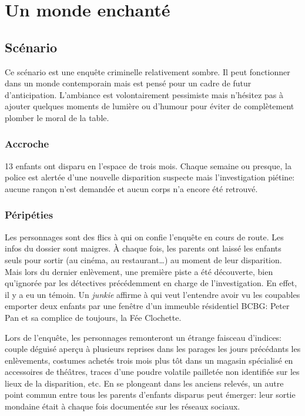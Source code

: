 \chapter{Un monde enchanté}

\section{Scénario}

Ce scénario est une enquête criminelle relativement sombre.
Il peut fonctionner dans un monde contemporain mais est pensé pour un cadre de futur d'anticipation.
L'ambiance est volontairement pessimiste mais n'hésitez pas à ajouter quelques moments de lumière ou d'humour pour éviter de complètement plomber le moral de la table.

\subsection{Accroche}

13 enfants ont disparu en l'espace de trois mois.
Chaque semaine ou presque, la police est alertée d'une nouvelle disparition suspecte mais l'investigation piétine: aucune rançon n'est demandée et aucun corps n'a encore été retrouvé.

\subsection{Péripéties}

Les personnages sont des flics à qui on confie l'enquête en cours de route.
Les infos du dossier sont maigres.
À chaque fois, les parents ont laissé les enfants seuls pour sortir (au cinéma, au restaurant\dots) au moment de leur disparition.
Mais lors du dernier enlèvement, une première piste a été découverte, bien qu'ignorée par les détectives précédemment en charge de l'investigation.
En effet, il y a eu un témoin.
Un \emph{junkie} affirme à qui veut l'entendre avoir vu les coupables emporter deux enfants par une fenêtre d'un immeuble résidentiel BCBG: Peter Pan et sa complice de toujours, la Fée Clochette.

Lors de l'enquête, les personnages remonteront un étrange faisceau d'indices: couple déguisé aperçu à plusieurs reprises dans les parages les jours précédants les enlèvements, costumes achetés trois mois plus tôt dans un magasin spécialisé en accessoires de théâtres, traces d'une poudre volatile pailletée non identifiée sur les lieux de la disparition, etc.
En se plongeant dans les anciens relevés, un autre point commun entre tous les parents d'enfants disparus peut émerger: leur sortie mondaine était à chaque fois documentée sur les réseaux sociaux.

